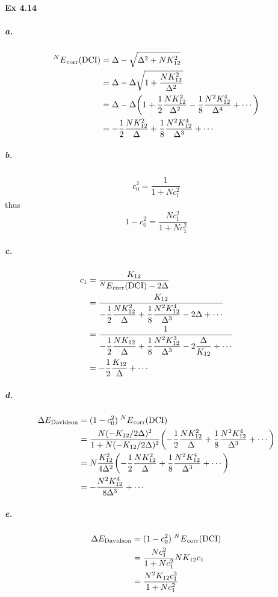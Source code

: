 \documentclass[a4paper]{article}
\DeclareMathOperator{\corr}{\mathrm{corr}}
\newcommand{\ex}[1]{\paragraph{Ex #1}}
\newcommand{\subex}[1]{\subparagraph{#1}}
\numberwithin{equation}{subsection}
\begin{document}
\ex{4.14}
\subex{a.}
\begin{align}
{^N E}_{\corr}(\text{DCI}) &= \Delta - \sqrt{\Delta^2 + N K_{12}^2} \notag\\
&= \Delta - \Delta\sqrt{1 + \dfrac{N K_{12}^2}{\Delta^2}} \notag\\
&= \Delta - \Delta\qty(1 + \dfrac{1}{2}\dfrac{N K_{12}^2}{\Delta^2} - \dfrac{1}{8}\dfrac{N^2 K_{12}^4}{\Delta^4} + \cdots) \notag\\
&= -\dfrac{1}{2}\dfrac{N K_{12}^2}{\Delta} + \dfrac{1}{8}\dfrac{N^2 K_{12}^4}{\Delta^3} + \cdots
\end{align}
\subex{b.}
\begin{align}
c_0^2 = \dfrac{1}{1 + N c_1^2}
\end{align}
thus
\begin{equation}\label{key}
1 - c_0^2 = \dfrac{N c_1^2}{1 + N c_1^2}
\end{equation}
\subex{c.}
\begin{align}
c_1 &= \dfrac{K_{12}}{{^N E}_{\corr}(\text{DCI}) - 2\Delta} \notag\\
&= \dfrac{K_{12}}{-\dfrac{1}{2}\dfrac{N K_{12}^2}{\Delta} + \dfrac{1}{8}\dfrac{N^2 K_{12}^4}{\Delta^3} - 2\Delta + \cdots} \notag\\
&= \dfrac{1}{-\dfrac{1}{2}\dfrac{N K_{12}}{\Delta} + \dfrac{1}{8}\dfrac{N^2 K_{12}^3}{\Delta^3} - 2\dfrac{\Delta}{K_{12}} + \cdots} \notag\\
&= -\dfrac{1}{2}\dfrac{K_{12}}{\Delta} + \cdots
\end{align}
\subex{d.}
\begin{align}
\Delta E_{\text{Davidson}} &= (1 - c_0^2) \; {^N E}_{\corr}(\text{DCI}) \\
&= \dfrac{N (-K_{12}/2\Delta)^2}{1 + N (-K_{12}/2\Delta)^2} \qty(-\dfrac{1}{2}\dfrac{N K_{12}^2}{\Delta} + \dfrac{1}{8}\dfrac{N^2 K_{12}^4}{\Delta^3} + \cdots) \notag\\
&= N \dfrac{K_{12}^2}{4\Delta^2} \qty(-\dfrac{1}{2}\dfrac{N K_{12}^2}{\Delta} + \dfrac{1}{8}\dfrac{N^2 K_{12}^4}{\Delta^3} + \cdots) \notag\\
&= -\dfrac{N^2 K_{12}^4}{8\Delta^3} +\cdots
\end{align}
\subex{e.}
\begin{align}
\Delta E_{\text{Davidson}} &= (1 - c_0^2) \; {^N E}_{\corr}(\text{DCI}) \notag\\
&= \dfrac{N c_1^2}{1 + N c_1^2} NK_{12}c_1 \notag\\
&= \dfrac{N^2 K_{12} c_1^3}{1 + N c_1^2}
\end{align}
\end{document}
